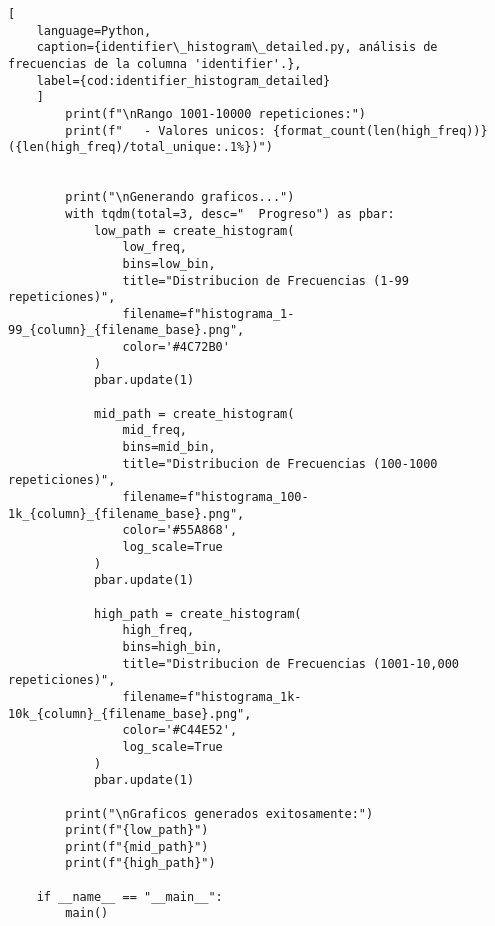 \begin{lstlisting}[
    language=Python,
    caption={identifier\_histogram\_detailed.py, análisis de frecuencias de la columna 'identifier'.},
    label={cod:identifier_histogram_detailed}
    ]
        print(f"\nRango 1001-10000 repeticiones:")
        print(f"   - Valores unicos: {format_count(len(high_freq))} ({len(high_freq)/total_unique:.1%})")
    

        print("\nGenerando graficos...")
        with tqdm(total=3, desc="  Progreso") as pbar:
            low_path = create_histogram(
                low_freq, 
                bins=low_bin,
                title="Distribucion de Frecuencias (1-99 repeticiones)",
                filename=f"histograma_1-99_{column}_{filename_base}.png",
                color='#4C72B0'
            )
            pbar.update(1)
            
            mid_path = create_histogram(
                mid_freq,
                bins=mid_bin,
                title="Distribucion de Frecuencias (100-1000 repeticiones)",
                filename=f"histograma_100-1k_{column}_{filename_base}.png",
                color='#55A868',
                log_scale=True
            )
            pbar.update(1)
            
            high_path = create_histogram(
                high_freq,
                bins=high_bin,
                title="Distribucion de Frecuencias (1001-10,000 repeticiones)",
                filename=f"histograma_1k-10k_{column}_{filename_base}.png",
                color='#C44E52',
                log_scale=True
            )
            pbar.update(1)
        
        print("\nGraficos generados exitosamente:")
        print(f"{low_path}")
        print(f"{mid_path}")
        print(f"{high_path}")

    if __name__ == "__main__":
        main()
\end{lstlisting}
\vfill

